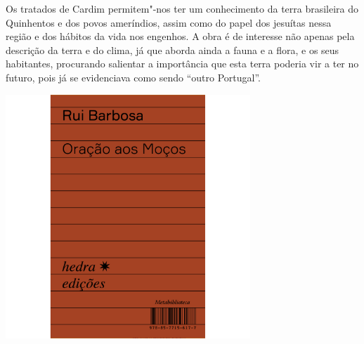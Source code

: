 Os tratados de Cardim permitem"-nos ter um conhecimento da terra brasileira do Quinhentos e dos povos ameríndios, assim como do papel dos jesuítas nessa região e dos hábitos da vida nos engenhos. A obra é de interesse não apenas pela descrição da terra e do clima, já que aborda ainda a fauna e a flora, e os seus habitantes, procurando salientar a importância que esta terra poderia vir a ter no futuro, pois já se evidenciava como sendo “outro Portugal”. 

\vfill

\hspace*{-.4cm}\begin{minipage}[c]{.5\linewidth}
\small{
{}}
\end{minipage}

\pagebreak

\begin{center}
\hspace*{.5cm}\includegraphics[width=92mm]{./grid/barbosa.jpg}
\end{center}

\hspace*{-7cm}\hrulefill\hspace*{-7cm}

